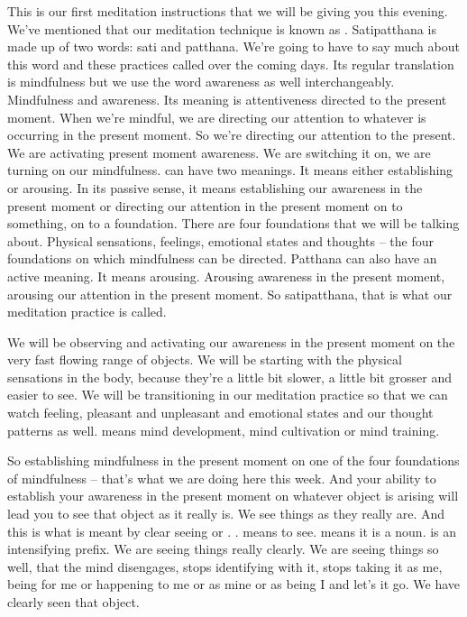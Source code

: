 \documentclass[letterpaper,10pt,english]{sphinxmanual}
\begin{document}
\sphinxAtStartPar
This is our first meditation instructions that we will be giving you this
evening. We’ve mentioned that our meditation technique is known as
. Satipatthana is made up of two words: sati and patthana.
We’re going to have to say much about this word and these practices called
over the coming days. Its regular translation is mindfulness but we use
the word awareness as well interchangeably. Mindfulness and awareness. Its
meaning is attentiveness directed to the present moment. When we’re mindful,  we  are  directing  our  attention  to  whatever  is  occurring  in  the  present
moment. So we’re directing our attention to the present. We are activating
present moment awareness. We are switching it on, we are turning on our
mindfulness.
can have two meanings. It means either establishing
or arousing. In its passive sense, it means establishing our awareness in the
present moment or directing our attention in the present moment on to something, on to a foundation. There are four foundations that we will be talking
about. Physical sensations, feelings, emotional states and thoughts – the four
foundations on which mindfulness can be directed. Patthana can also have
an  active  meaning.  It  means  arousing. Arousing  awareness  in  the  present
moment, arousing our attention in the present moment. So satipatthana, that
is what our meditation practice is called.

\sphinxAtStartPar
We  will  be  observing  and  activating  our  awareness  in  the  present
  moment on the very fast flowing range of objects. We will be starting with
the physical sensations in the body, because they’re a little bit slower, a little
bit grosser and easier to see. We will be transitioning in our meditation practice  so  that  we  can  watch  feeling,  pleasant  and  unpleasant  and  emotional
states and our thought patterns as well.
means mind development,
mind cultivation or mind training.

\sphinxAtStartPar
So establishing mindfulness in the present moment on one of the four
foundations of mindfulness – that’s what we are doing here this week. And
your ability to establish your awareness in the present moment on whatever
object is arising will lead you to see that object as it really is. We see things
as they really are. And this is what is meant by clear seeing or
. .  means to see.  means it is a noun.
 is an intensifying
prefix. We are seeing things really clearly. We are seeing things so well, that
the mind disengages, stops identifying with it, stops taking it as me, being
for me or happening to me or as mine or as being I and let’s it go. We have
clearly seen that object.
\end{document}
